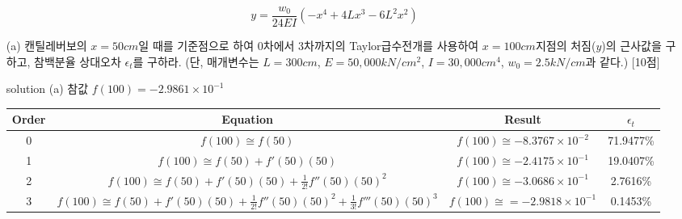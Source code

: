 \documentclass[a4,10pt]{article}
\numberwithin{algorithm}{section}
\theoremstyle{examplestyle}
\let\\\tabularnewline
\let\\\tabularnewline
\begin{document}
\begin{equation}\label{eq:e2}
y=\frac{w_{0}}{24EI}\left(-x^4+4Lx^3-6L^2 x^2\right)
\end{equation}
\begin{itemize}
\item[(a)] 캔틸레버보의 $x=50cm$일 때를 기준점으로 하여 0차에서 3차까지의 Taylor급수전개를 사용하여 $x=100cm$지점의 처짐($y$)의 근사값을 구하고, 참백분율 상대오차 $\epsilon_{t}$를 구하라. (단, 매개변수는 $L=300cm$, $E=50,000kN/cm^2$, $I=30,000cm^4$, $w_{0}=2.5kN/cm$과 같다.) [10점]
\item[solution (a)]
참값 $f(100)=-2.9861 \times 10^{-1}$
\begin{table}[!hbpt]
\centering
\begin{tabular}{c|c|c|c}
\hline\hline
Order&Equation&Result&$\epsilon_{t}$\\
\hline
0&$f(100)\cong f(50)$&$f(100)\cong -8.3767\times 10^{-2}$& 71.9477\%\\
1&$f(100)\cong f(50)+f'(50)(50)$&$f(100)\cong -2.4175\times 10^{-1}$ &  19.0407\%\\
2&$f(100)\cong f(50)+f'(50)(50)+\frac{1}{2!}f''(50)(50)^2$&$f(100)\cong-3.0686\times 10^{-1}$&2.7616\%\\
3&$f(100)\cong f(50)+f'(50)(50)+\frac{1}{2!}f''(50)(50)^2+\frac{1}{3!}f'''(50)(50)^3$&$f(100)\cong = -2.9818\times 10^{-1}$&0.1453\%
\\ \hline\hline
\end{tabular}
\end{table}



\end{itemize}
\end{document}
